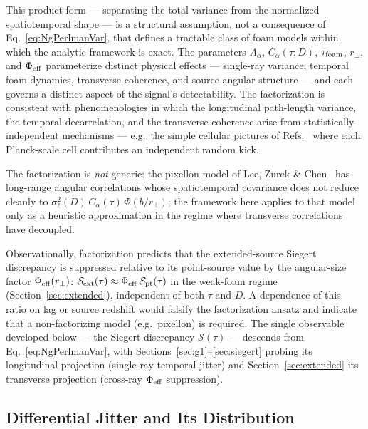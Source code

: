 \documentclass[aps,prd,onecolumn,amsmath,amssymb]{revtex4-2}
\begin{document}
This product form --- separating the total variance from the normalized
spatiotemporal shape --- is a structural assumption, not a consequence of
Eq.~\eqref{eq:NgPerlmanVar}, that defines a tractable class of foam models
within which the analytic framework is exact.
The parameters $A_\alpha$, $C_\alpha(\tau;D)$, $\tau_{\rm foam}$, $r_\perp$, and
$\Phi_{\rm eff}$ parameterize distinct physical effects --- single-ray variance,
temporal foam dynamics, transverse coherence, and source angular structure ---
and each governs a distinct aspect of the signal's detectability.
The factorization is consistent with phenomenologies in which the
longitudinal path-length variance, the temporal decorrelation, and the
transverse coherence arise from statistically independent
mechanisms --- e.g.\ the simple cellular pictures of
Refs.~\cite{Ng2001,Ng2003,NgPerlman2022} where each Planck-scale cell
contributes an independent random kick.

The factorization is \emph{not} generic: the
pixellon model of Lee, Zurek \& Chen~\cite{LeeZurekChen2024} has
long-range angular correlations whose spatiotemporal covariance does
not reduce cleanly to $\sigma_\ell^2(D)\,C_\alpha(\tau)\,\Phi(b/r_\perp)$;
the framework here applies to that model only as a heuristic
approximation in the regime where transverse correlations have
decoupled.

Observationally, factorization predicts that the extended-source Siegert
discrepancy is suppressed relative to its point-source value by the
angular-size factor $\Phi_{\rm eff}(r_\perp)$:
$\mathcal{S}_{\rm ext}(\tau) \approx \Phi_{\rm eff}\,\mathcal{S}_{\rm pt}(\tau)$
in the weak-foam regime (Section~\ref{sec:extended}), independent of both
$\tau$ and $D$.  A dependence of this ratio on lag or source redshift
would falsify the factorization ansatz and indicate that a non-factorizing
model (e.g.\ pixellon) is required.
The single observable developed below --- the Siegert discrepancy
$\mathcal{S}(\tau)$ --- descends from Eq.~\eqref{eq:NgPerlmanVar}, with
Sections~\ref{sec:g1}--\ref{sec:siegert} probing its longitudinal
projection (single-ray temporal jitter) and Section~\ref{sec:extended}
its transverse projection (cross-ray $\Phi_{\rm eff}$ suppression).

\subsection{Differential Jitter and Its Distribution}
\label{sec:differential_jitter}
\end{document}
